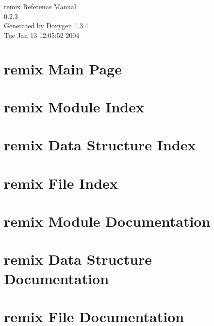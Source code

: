 \documentclass[a4paper]{book}
\begin{document}
\begin{titlepage}
\vspace*{7cm}
\begin{center}
{\Large remix Reference Manual\\[1ex]\large 0.2.3 }\\
\vspace*{1cm}
{\large Generated by Doxygen 1.3.4}\\
\vspace*{0.5cm}
{\small Tue Jan 13 12:05:52 2004}\\
\end{center}
\end{titlepage}
\clearemptydoublepage
{}
\tableofcontents
\clearemptydoublepage
{}
\chapter{remix Main Page}
\label{index}
\chapter{remix Module Index}

\chapter{remix Data Structure Index}

\chapter{remix File Index}

\chapter{remix Module Documentation}








\chapter{remix Data Structure Documentation}

\chapter{remix File Documentation}








\printindex
\end{document}
